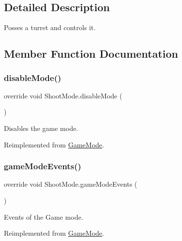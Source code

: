 \subsection{Detailed Description}
Posses a turret and controls it. 



\subsection{Member Function Documentation}
\mbox{\label{class_shoot_mode_a172531ba502bfea3d75404e1c890db6b}} 
\subsubsection{\texorpdfstring{disable\+Mode()}{disableMode()}}
{\footnotesize\ttfamily override void Shoot\+Mode.\+disable\+Mode (\begin{DoxyParamCaption}{ }\end{DoxyParamCaption})\hspace{0.3cm}{\ttfamily [virtual]}}



Disables the game mode. 



Reimplemented from \mbox{\hyperlink{class_game_mode_a5aea49bdae2459b78e1972dd0a34918e}{Game\+Mode}}.

\mbox{\label{class_shoot_mode_a3c9ab9c7883d23161205abebbc233c13}} 
\subsubsection{\texorpdfstring{game\+Mode\+Events()}{gameModeEvents()}}
{\footnotesize\ttfamily override void Shoot\+Mode.\+game\+Mode\+Events (\begin{DoxyParamCaption}{ }\end{DoxyParamCaption})\hspace{0.3cm}{\ttfamily [virtual]}}



Events of the Game mode. 



Reimplemented from \mbox{\hyperlink{class_game_mode_a32a61bf0dfef83cfc1724b92f3d50cdf}{Game\+Mode}}.

